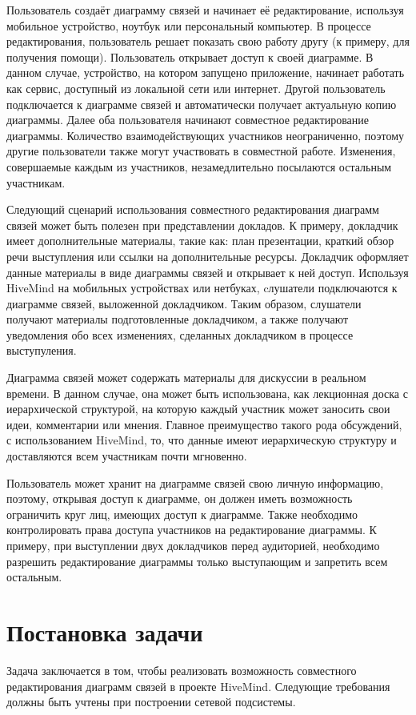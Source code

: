 Пользователь создаёт диаграмму связей и начинает её редактирование, используя
мобильное устройство, ноутбук или персональный компьютер. В процессе
редактирования, пользователь решает показать свою работу другу (к примеру, для
получения помощи). Пользователь открывает доступ к своей диаграмме. В данном
случае, устройство, на котором запущено приложение, начинает работать как
сервис, доступный из локальной сети или интернет. Другой пользователь
подключается к диаграмме связей и автоматически получает актуальную копию
диаграммы. Далее оба пользователя начинают совместное редактирование диаграммы.
Количество взаимодействующих участников неограниченно, поэтому другие
пользователи также могут участвовать в совместной работе. Изменения, совершаемые
каждым из участников, незамедлительно посылаются остальным участникам.

Следующий сценарий использования совместного редактирования диаграмм связей
может быть полезен при представлении докладов. К примеру, докладчик имеет
дополнительные материалы, такие как: план презентации, краткий обзор речи
выступления или ссылки на дополнительные ресурсы. Докладчик оформляет данные
материалы в виде диаграммы связей и открывает к ней доступ. Используя HiveMind
на мобильных устройствах или нетбуках, cлушатели подключаются к диаграмме
связей, выложенной докладчиком. Таким образом, слушатели получают материалы
подготовленные докладчиком, а также получают уведомления обо всех изменениях,
сделанных докладчиком в процессе выступуления.

Диаграмма связей может содержать материалы для дискуссии в реальном времени. В
данном случае, она может быть использована, как лекционная доска с иерархической
структурой, на которую каждый участник может заносить свои идеи, комментарии или
мнения. Главное преимущество такого рода обсуждений, с использованием HiveMind,
то, что данные имеют иерархическую структуру и доставляются всем участникам
почти мгновенно.

Пользователь может хранит на диаграмме связей свою личную информацию, поэтому,
открывая доступ к диаграмме, он должен иметь возможность ограничить круг
лиц, имеющих доступ к диаграмме. Также необходимо контролировать права доступа
участников на редактирование диаграммы. К примеру, при выступлении двух
докладчиков перед аудиторией, необходимо разрешить редактирование диаграммы
только выступающим и запретить всем остальным.


\section{Постановка задачи}
\label{sec:problem_statement}
Задача заключается в том, чтобы реализовать возможность совместного
редактирования диаграмм связей в проекте HiveMind. Следующие требования должны
быть учтены при построении сетевой подсистемы.


